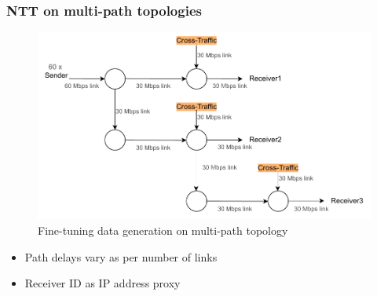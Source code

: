 \documentclass{beamer}
\begin{document}
{}

\begin{frame}
\frametitle{NTT on multi-path topologies}


\begin{figure}[h]
  \begin{center}
    \includegraphics[scale=0.58]{figures/complex_topo.pdf}
    \caption{Fine-tuning data generation on multi-path topology}
    \label{fig:topo_ft_big}
  \end{center}
\end{figure}

\pause 
\vspace{-0.6cm}
\begin{itemize}
    \item<1-> Path delays vary as per number of links 
    \item<1-> Receiver ID as IP address proxy
\end{itemize}

\end{frame}
\end{document}
